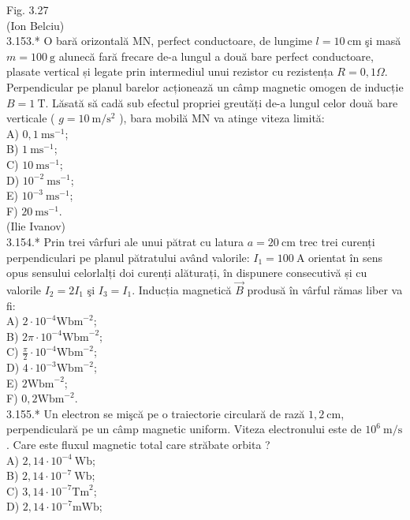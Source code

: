 \documentclass[10pt]{article}
\begin{document}
Fig. 3.27\\
(Ion Belciu)\\
3.153.* O bară orizontală MN, perfect conductoare, de lungime $l=10 \mathrm{~cm}$ şi masă $m=100 \mathrm{~g}$ alunecă fară frecare de-a lungul a două bare perfect conductoare, plasate vertical și legate prin intermediul unui rezistor cu rezistența $R=0,1 \Omega$. Perpendicular pe planul barelor acționează un câmp magnetic omogen de inducție $B=1 \mathrm{~T}$. Lăsată să cadă sub efectul propriei greutăți de-a lungul celor două bare verticale ( $g=10 \mathrm{~m} / \mathrm{s}^{2}$ ), bara mobilă MN va atinge viteza limită:\\
A) $0,1 \mathrm{~ms}^{-1}$;\\
B) $1 \mathrm{~ms}^{-1}$;\\
C) $10 \mathrm{~ms}^{-1}$;\\
D) $10^{-2} \mathrm{~ms}^{-1}$;\\
E) $10^{-3} \mathrm{~ms}^{-1}$;\\
F) $20 \mathrm{~ms}^{-1}$.\\
(Ilie Ivanov)\\
3.154.* Prin trei vârfuri ale unui pătrat cu latura $a=20 \mathrm{~cm}$ trec trei curenți perpendiculari pe planul pătratului având valorile: $I_{1}=100 \mathrm{~A}$ orientat în sens opus sensului celorlalți doi curenți alăturați, în dispunere consecutivă și cu valorile $I_{2}=2 I_{1}$ şi $I_{3}=I_{1}$. Inducția magnetică $\vec{B}$ produsă în vârful rămas liber va fi:\\
A) $2 \cdot 10^{-4} \mathrm{Wbm}^{-2}$;\\
B) $2 \pi \cdot 10^{-4} \mathrm{Wbm}^{-2}$;\\
C) $\frac{\pi}{2} \cdot 10^{-4} \mathrm{Wbm}^{-2}$;\\
D) $4 \cdot 10^{-3} \mathrm{Wbm}^{-2}$;\\
E) $2 \mathrm{Wbm}^{-2}$;\\
F) $0,2 \mathrm{Wbm}^{-2}$.\\
3.155.* Un electron se mişcă pe o traiectorie circulară de rază $1,2 \mathrm{~cm}$, perpendiculară pe un câmp magnetic uniform. Viteza electronului este de $10^{6} \mathrm{~m} / \mathrm{s}$. Care este fluxul magnetic total care străbate orbita ?\\
A) $2,14 \cdot 10^{-4} \mathrm{~Wb}$;\\
B) $2,14 \cdot 10^{-7} \mathrm{~Wb}$;\\
C) $3,14 \cdot 10^{-7} \mathrm{Tm}^{2}$;\\
D) $2,14 \cdot 10^{-7} \mathrm{mWb}$;\\
\end{document}
